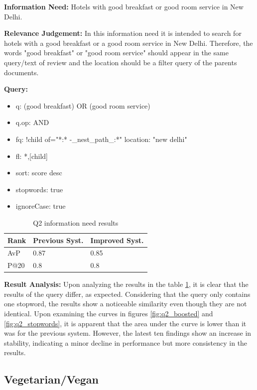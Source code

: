 \documentclass[sigconf]{acmart}
\begin{document}
\textbf{Information Need:} Hotels with good breakfast or good room service in New Delhi.

\textbf{Relevance Judgement:} In this information need it is intended to search for hotels with a good breakfast or a good room service in New Delhi. Therefore, the words "good breakfast" or "good room service" should appear in the same query/text of review and the location should be a filter query of the parents documents.

\textbf{Query:}

\begin{itemize}
    \item q: (good breakfast) OR (good room service)
    \item q.op: AND
    \item fq: {!child of="*:* -\_nest\_path\_:*"} location: "new delhi"
    \item fl: *,[child]
    \item sort: score desc
    \item stopwords: true
    \item ignoreCase: true
\end{itemize}

\begin{table}[H]
\caption{Q2 information need results}
\label{tab:q5}
\begin{tabular}{lll}
\toprule
Rank & Previous Syst. & Improved Syst.\\
\midrule
AvP & 0.87 & 0.85  \\
P@20 & 0.8 & 0.8 \\
\bottomrule
\end{tabular}
\end{table}

\textbf{Result Analysis:} Upon analyzing the results in the table \ref{tab:q5}, it is clear that the results of the query differ, as expected. Considering that the query only contains one stopword, the results show a noticeable similarity even though they are not identical.
Upon examining the curves in figures \ref{fig:q2_boosted} and \ref{fig:q2_stopwords}, it is apparent that the area under the curve is lower than it was for the previous system. However, the latest ten findings show an increase in stability, indicating a minor decline in performance but more consistency in the results.

\subsection{Vegetarian/Vegan}
\end{document}

